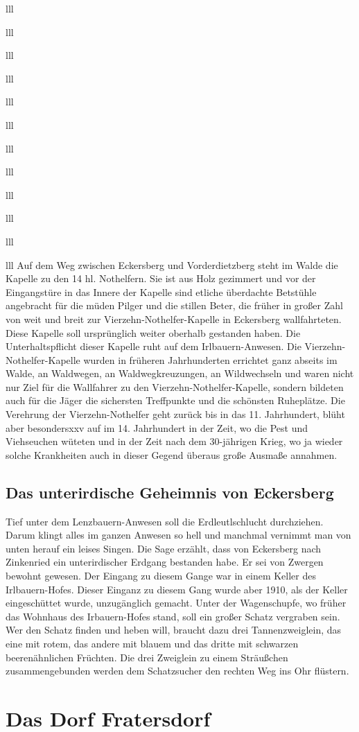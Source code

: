 \documentclass[12pt,a4pager]{book}
\begin{document}
\begin{tabuluar}{lll}
\begin{tabuluar}{lll}
\begin{tabuluar}{lll}
\begin{tabuluar}{lll}
\begin{tabuluar}{lll}
\begin{tabuluar}{lll}
\begin{tabuluar}{lll}
\begin{tabuluar}{lll}
\begin{tabuluar}{lll}
\begin{tabuluar}{lll}
\begin{tabuluar}{lll}
\begin{tabuluar}{lll}
Auf dem Weg zwischen Eckersberg und Vorderdietzberg steht im Walde die Kapelle
zu den 14 hl. Nothelfern. Sie ist aus Holz gezimmert und vor der Eingangstüre in
das Innere der Kapelle sind etliche überdachte Betstühle angebracht für die
müden Pilger und die stillen Beter, die früher in großer Zahl von weit und breit
zur Vierzehn-Nothelfer-Kapelle in Eckersberg wallfahrteten. Diese Kapelle soll
ursprünglich weiter oberhalb gestanden haben. Die Unterhaltspflicht dieser
Kapelle ruht auf dem Irlbauern-Anwesen. Die Vierzehn-Nothelfer-Kapelle wurden in
früheren Jahrhunderten errichtet ganz abseits im Walde, an Waldwegen, an
Waldwegkreuzungen, an Wildwechseln und waren nicht nur Ziel für die Wallfahrer
zu den Vierzehn-Nothelfer-Kapelle, sondern bildeten auch für die Jäger die
sichersten Treffpunkte und die schönsten Ruheplätze. Die Verehrung der
Vierzehn-Nothelfer geht zurück bis in das 11. Jahrhundert, blüht aber
besondersxxv auf im 14. Jahrhundert in der Zeit, wo die Pest und Viehseuchen
wüteten und in der Zeit nach dem 30-jährigen Krieg, wo ja wieder solche
Krankheiten auch in dieser Gegend überaus große Ausmaße annahmen.

\subsection{Das unterirdische Geheimnis von Eckersberg}

Tief unter dem Lenzbauern-Anwesen soll die Erdleutlschlucht durchziehen. Darum
klingt alles im ganzen Anwesen so hell und manchmal vernimmt man von unten
herauf ein leises Singen. Die Sage erzählt, dass von Eckersberg nach Zinkenried
ein unterirdischer Erdgang bestanden habe. Er sei von Zwergen bewohnt gewesen.
Der Eingang zu diesem Gange war in einem Keller des Irlbauern-Hofes. Dieser
Einganz zu diesem Gang wurde aber 1910, als der Keller eingeschüttet wurde,
unzugänglich gemacht. Unter der Wagenschupfe, wo früher das Wohnhaus des
Irbauern-Hofes stand, soll ein großer Schatz vergraben sein. Wer den Schatz
finden und heben will, braucht dazu drei Tannenzweiglein, das eine mit rotem,
das andere mit blauem und das dritte mit schwarzen beerenähnlichen Früchten. Die
drei Zweiglein zu einem Sträußchen zusammengebunden werden dem Schatzsucher den
rechten Weg ins Ohr flüstern.

\section{Das Dorf Fratersdorf}


\end{tabuluar}
\end{tabuluar}
\end{tabuluar}
\end{tabuluar}
\end{tabuluar}
\end{tabuluar}
\end{tabuluar}
\end{tabuluar}
\end{tabuluar}
\end{tabuluar}
\end{tabuluar}
\end{tabuluar}
\end{document}
